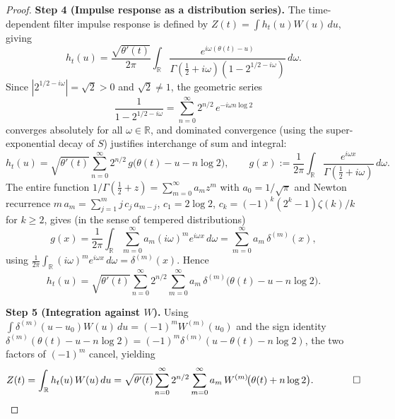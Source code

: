 \documentclass{amsart}
\begin{document}
\begin{proof}
\textbf{Step 4 (Impulse response as a distribution series).}
The time-dependent filter impulse response is defined by
$Z(t)=\int h_t(u)W(u)\,du$, giving
\[
  h_t(u)
  = \frac{\sqrt{\theta'(t)}}{2\pi}
    \int_{\mathbb{R}}
    \frac{e^{i\omega(\theta(t)-u)}}
         {\Gamma(\tfrac{1}{2}+i\omega)(1-2^{1/2-i\omega})}
    \,d\omega.
\]
Since $|2^{1/2-i\omega}|=\sqrt{2}>0$ and $\sqrt{2}\ne 1$, the
geometric series
\[
  \frac{1}{1-2^{1/2-i\omega}}
  = \sum_{n=0}^{\infty} 2^{n/2}\,e^{-i\omega n\log 2}
\]
converges absolutely for all $\omega\in\mathbb{R}$, and dominated
convergence (using the super-exponential decay of $S$) justifies
interchange of sum and integral:
\[
  h_t(u)
  = \sqrt{\theta'(t)}\sum_{n=0}^{\infty} 2^{n/2}\,
    g\bigl(\theta(t)-u-n\log 2\bigr),
  \qquad
  g(x):=\frac{1}{2\pi}\int_{\mathbb{R}}
  \frac{e^{i\omega x}}{\Gamma(\tfrac{1}{2}+i\omega)}\,d\omega.
\]
The entire function $1/\Gamma(\tfrac{1}{2}+z)=\sum_{m=0}^\infty a_m z^m$
with $a_0=1/\sqrt{\pi}$ and Newton recurrence
$m\,a_m=\sum_{j=1}^m j\,c_j\,a_{m-j}$,
$c_1=2\log 2$, $c_k=(-1)^k(2^k-1)\zeta(k)/k$ for $k\ge 2$,
gives (in the sense of tempered distributions)
\[
  g(x)
  = \frac{1}{2\pi}\int_{\mathbb{R}}
    \sum_{m=0}^{\infty} a_m(i\omega)^m e^{i\omega x}\,d\omega
  = \sum_{m=0}^{\infty} a_m\,\delta^{(m)}(x),
\]
using $\frac{1}{2\pi}\int_{\mathbb{R}}(i\omega)^m e^{i\omega x}\,d\omega
=\delta^{(m)}(x)$.  Hence
\[
  h_t(u)
  = \sqrt{\theta'(t)}\sum_{n=0}^{\infty}2^{n/2}
    \sum_{m=0}^{\infty}a_m\,\delta^{(m)}
    \!\bigl(\theta(t)-u-n\log 2\bigr).
\]

\textbf{Step 5 (Integration against $W$).}
Using $\int\delta^{(m)}(u-u_0)W(u)\,du=(-1)^m W^{(m)}(u_0)$
and the sign identity
$\delta^{(m)}(\theta(t)-u-n\log 2)=(-1)^m\delta^{(m)}(u-\theta(t)-n\log 2)$,
the two factors of $(-1)^m$ cancel, yielding
\[
  Z(t)
  = \int_{\mathbb{R}} h_t(u)\,W(u)\,du
  = \sqrt{\theta'(t)}\sum_{n=0}^{\infty}2^{n/2}
    \sum_{m=0}^{\infty}a_m\,W^{(m)}\!\bigl(\theta(t)+n\log 2\bigr).
  \qquad\qed
\]
\end{proof}
\end{document}
